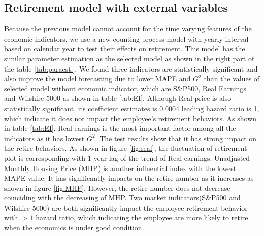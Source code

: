 \documentclass[12pt,letterpaper]{article}
\begin{document}
\subsection{Retirement model with external variables}
  Because the previous model cannot account for the time varying features of the economic indicators, we use a new counting process model with yearly interval based on calendar year to test their effects on retirement. This model has the similar parameter estimation as the selected model as shown in the right part of the table \ref{tab:paraest.}. We found three indicators are statistically significant and also improve the model forecasting due to lower MAPE and $G^2$ than the values of selected model without economic indicator, which are S\&P500, Real Earnings and Wilshire 5000 as shown in table \ref{tab:EI}. Although Real price is also statistically significant, its coefficient estimates is 0.0004 leading hazard ratio is 1, which indicate it does not impact the employee's retirement behaviors. As shown in table \ref{tab:EI}, Real earnings is the most important factor among all the indicators as it has lowest $G^2$. The test results show that it has strong impact on the retire behaviors. As shown in figure \ref{fig:real}, the fluctuation of retirement plot is corresponding with 1 year lag of the trend of Real earnings. Unadjusted Monthly Housing Price (MHP) is another influential index with the lowest MAPE value. It has significantly impacts on the retire number as it increases as shown in figure \ref{fig:MHP}. However, the retire number does not decrease coinciding with the decreasing of MHP. Two market indicators(S\&P500 and Wilshire 5000) are both significantly impact the employee retirement behavior with $>1$ hazard ratio, which indicating the employee are more likely to retire when the economics is under good condition. 
\end{document}
